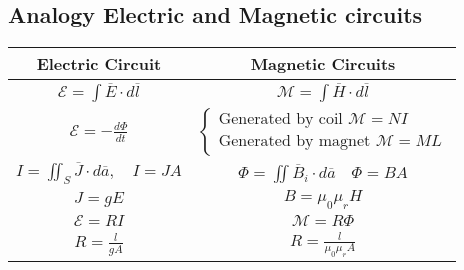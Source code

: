 \documentclass[leqno]{article}
\begin{document}
\subsection{Analogy Electric and Magnetic circuits}
\begin{center}
\begin{tabular}{|c|c|}
  \hline
  Electric Circuit & Magnetic Circuits \\
\hline
  $ \mathcal{E} = \int \overline{E} \cdot d\overline{l}$ & $\mathcal{M} = \int \overline{H}\cdot d\overline{l}$\\
  \hline
  $\displaystyle\mathcal{E} = -\frac{d\Phi}{dt}$ & $\begin{cases}
    \text{Generated by coil } \mathcal{M} = NI \\
	\text{Generated by magnet }  \mathcal{M} = ML 
  \end{cases}$ \\
  \hline
	$\displaystyle I = \iint_S \overline{J}\cdot d\overline{a}, \quad I = JA$ & $\displaystyle \Phi = \iint \overline{B}_i \cdot d\overline{a} \quad \Phi = BA$ \\
	\hline
	$J = gE$  & $B = \mu_0\mu_r H$ \\
	\hline
	$\mathcal{E} = RI$ & $\mathcal{M}=R\Phi$ \\
	\hline
	$\displaystyle R = \frac{l}{gA}$ & $\displaystyle R = \frac{l}{\mu_0\mu_r A}$ \\
	\hline


\end{tabular}
\end{center}
\end{document}
